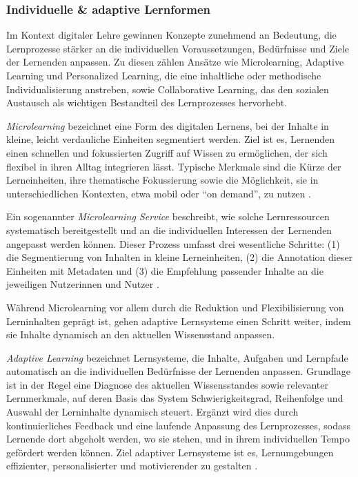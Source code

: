 \subsubsection{Individuelle \& adaptive Lernformen}


Im Kontext digitaler Lehre gewinnen Konzepte zunehmend an Bedeutung, die Lernprozesse stärker an die individuellen Voraussetzungen, Bedürfnisse und Ziele der Lernenden anpassen. Zu diesen zählen Ansätze wie Microlearning, Adaptive Learning und Personalized Learning, die eine inhaltliche oder methodische Individualisierung anstreben, sowie Collaborative Learning, das den sozialen Austausch als wichtigen Bestandteil des Lernprozesses hervorhebt.

\textit{Microlearning} bezeichnet eine Form des digitalen Lernens, bei der Inhalte in kleine, leicht verdauliche Einheiten segmentiert werden. Ziel ist es, Lernenden einen schnellen und fokussierten Zugriff auf Wissen zu ermöglichen, der sich flexibel in ihren Alltag integrieren lässt. Typische Merkmale sind die Kürze der Lerneinheiten, ihre thematische Fokussierung sowie die Möglichkeit, sie in unterschiedlichen Kontexten, etwa mobil oder \enquote{on demand}, zu nutzen \parencite[S.~74]{chong_mvr-cls_2022}.

Ein sogenannter \textit{Microlearning Service} beschreibt, wie solche Lernressourcen systematisch bereitgestellt und an die individuellen Interessen der Lernenden angepasst werden können. Dieser Prozess umfasst drei wesentliche Schritte: (1) die Segmentierung von Inhalten in kleine Lerneinheiten, (2) die Annotation dieser Einheiten mit Metadaten und (3) die Empfehlung passender Inhalte an die jeweiligen Nutzerinnen und Nutzer \parencite[S.~152--154]{lin_survey_2019}.

Während Microlearning vor allem durch die Reduktion und Flexibilisierung von Lerninhalten geprägt ist, gehen adaptive Lernsysteme einen Schritt weiter, indem sie Inhalte dynamisch an den aktuellen Wissensstand anpassen.

\textit{Adaptive Learning} bezeichnet Lernsysteme, die Inhalte, Aufgaben und Lernpfade automatisch an die individuellen Bedürfnisse der Lernenden anpassen. Grundlage ist in der Regel eine Diagnose des aktuellen Wissensstandes sowie relevanter Lernmerkmale, auf deren Basis das System Schwierigkeitsgrad, Reihenfolge und Auswahl der Lerninhalte dynamisch steuert. Ergänzt wird dies durch kontinuierliches Feedback und eine laufende Anpassung des Lernprozesses, sodass Lernende dort abgeholt werden, wo sie stehen, und in ihrem individuellen Tempo gefördert werden können. Ziel adaptiver Lernsysteme ist es, Lernumgebungen effizienter, personalisierter und motivierender zu gestalten \parencite[S.~448]{zhao_research_2019}.

